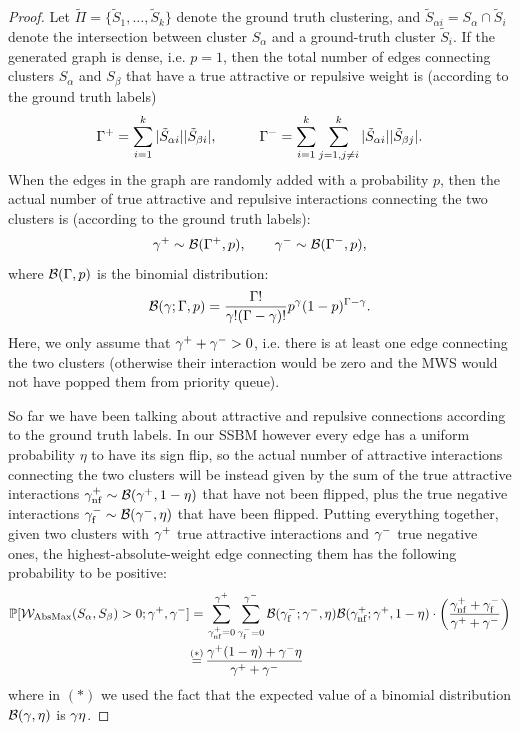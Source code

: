 \begin{proof}
Let $\tilde{\Pi}=\{\tilde{S}_1,\ldots,\tilde{S}_k\}$ denote the ground truth clustering, and $\tilde{S}_{\alpha i}=S_\alpha\cap \tilde{S}_i$ denote the intersection between cluster $S_{\alpha}$ and a ground-truth cluster $\tilde{S}_i$.
If the generated graph is dense, i.e. $p=1$, then the total number of edges connecting clusters $S_{\alpha}$ and $S_{\beta}$ that have a true attractive or repulsive weight is (according to the ground truth labels)
\begin{equation}
\Gamma^+=\sum_{i=1}^k |\tilde{S}_{\alpha i}||\tilde{S}_{\beta i}|, \quad\quad\quad \Gamma^-=\sum_{i=1}^k \sum_{j=1,j\neq i}^k |\tilde{S}_{\alpha i}||\tilde{S}_{\beta j}|.
\end{equation}
When the edges in the graph are randomly added with a probability $p$, then the actual number of true attractive and repulsive interactions connecting the two clusters is (according to the ground truth labels):
\begin{equation}
\gamma^+ \sim \mathcal{B}(\Gamma^+,p), \qquad \gamma^- \sim \mathcal{B}(\Gamma^-,p), 
\end{equation}
where $\mathcal{B}(\Gamma,p)$ is the binomial distribution:
\begin{equation}
\mathcal{B}(\gamma;\Gamma,p) = \frac{\Gamma !}{\gamma! (\Gamma-\gamma)!} p^\gamma (1-p)^{\Gamma-\gamma}.
\end{equation}
Here, we only assume that $\gamma^+ + \gamma^- >0$, i.e. there is at least one edge connecting the two clusters (otherwise their interaction would be zero and the MWS would not have popped them from priority queue). 

So far we have been talking about attractive and repulsive connections according to the ground truth labels. In our SSBM however every edge has a uniform probability $\eta$ to have its sign flip, so  the actual number of attractive interactions connecting the two clusters will be instead given by the sum of the true attractive interactions $\gamma^+_{\mathrm{nf}}\sim \mathcal{B}(\gamma^+,1-\eta)$ that have not been flipped, plus the true negative interactions $\gamma^-_{\mathrm{f}}\sim \mathcal{B}(\gamma^-,\eta)$ that have been flipped.
Putting everything together, given two clusters with $\gamma^+$ true attractive interactions and $\gamma^-$ true negative ones, the highest-absolute-weight edge connecting them has the following probability to be positive:
\begin{align}\label{eq:mws_prob}
 \mathbb{P}[\mathcal{W}_{\mathrm{AbsMax}}(S_\alpha,S_\beta)>0;\gamma^+,\gamma^-] = &\, \sum_{\gamma^+_{\mathrm{nf}}=0}^{\gamma^+}\sum_{\gamma^-_{\mathrm{f}}=0}^{\gamma^-} 
\mathcal{B}(\gamma^-_{\mathrm{f}};\gamma^-,\eta) \mathcal{B}(\gamma^+_{\mathrm{nf}};\gamma^+,1-\eta) \cdot \left(\frac{\gamma^+_{\mathrm{nf}}+\gamma^-_{\mathrm{f}}}{\gamma^+ + \gamma^-} \right) \nonumber\\
\stackrel{(*)}{=}&\,\frac{\gamma^+(1-\eta)+\gamma^-\eta}{\gamma^+ + \gamma^-}
\end{align}  
where in $(*)$ we used the fact that the expected value of a binomial distribution $\mathcal{B}(\gamma,\eta)$ is $\gamma \eta$.


\end{proof}
